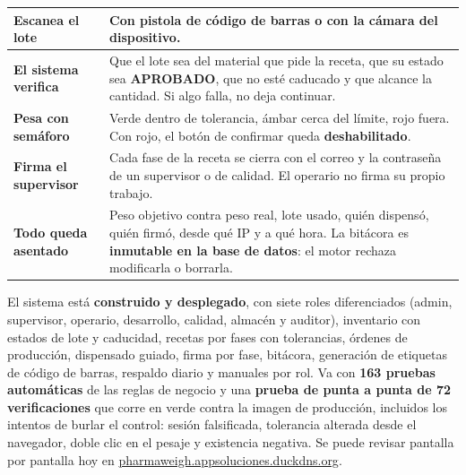 \documentclass[11pt,letterpaper]{article}
\newcommand{\demoURL}{pharmaweigh.appsoluciones.duckdns.org}
\begin{document}
\noindent
\footnotesize
\begin{tabularx}{\linewidth}{@{}>{\bfseries\color{azulcom}}p{4.0cm} X@{}}
\toprule
Escanea el lote & Con pistola de código de barras o con la cámara del dispositivo. \\
\midrule
El sistema verifica & Que el lote sea del material que pide la receta, que su estado sea \textbf{APROBADO}, que no esté caducado y que alcance la cantidad. Si algo falla, no deja continuar. \\
\midrule
Pesa con semáforo & Verde dentro de tolerancia, ámbar cerca del límite, rojo fuera. Con rojo, el botón de confirmar queda \textbf{deshabilitado}. \\
\midrule
Firma el supervisor & Cada fase de la receta se cierra con el correo y la contraseña de un supervisor o de calidad. El operario no firma su propio trabajo. \\
\midrule
Todo queda asentado & Peso objetivo contra peso real, lote usado, quién dispensó, quién firmó, desde qué IP y a qué hora. La bitácora es \textbf{inmutable en la base de datos}: el motor rechaza modificarla o borrarla. \\
\bottomrule
\end{tabularx}
\normalsize

\vspace{6pt}

\begin{cajaInfo}
El sistema está \textbf{construido y desplegado}, con siete roles diferenciados (admin, supervisor, operario, desarrollo, calidad, almacén y auditor), inventario con estados de lote y caducidad, recetas por fases con tolerancias, órdenes de producción, dispensado guiado, firma por fase, bitácora, generación de etiquetas de código de barras, respaldo diario y manuales por rol. Va con \textbf{163 pruebas automáticas} de las reglas de negocio y una \textbf{prueba de punta a punta de 72 verificaciones} que corre en verde contra la imagen de producción, incluidos los intentos de burlar el control: sesión falsificada, tolerancia alterada desde el navegador, doble clic en el pesaje y existencia negativa. Se puede revisar pantalla por pantalla hoy en \href{https://\demoURL}{\demoURL}.
\end{cajaInfo}

\vspace{7pt}

\end{document}

